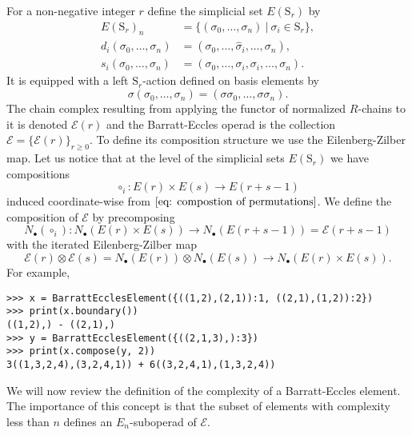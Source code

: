 \documentclass{amsart}
\renewcommand{\S}{\mathrm S}
\begin{document}
For a non-negative integer $r$ define the simplicial set $E(\mathrm S_r)$ by
\begin{align*}
E(\mathrm S_r)_n &= \{ (\sigma_0, \dots, \sigma_n)\ |\ \sigma_i \in \mathrm{S}_r\}, \\
d_i(\sigma_0, \dots, \sigma_n) &= (\sigma_0, \dots, \widehat{\sigma}_i, \dots, \sigma_n), \\
s_i(\sigma_0, \dots, \sigma_n) &= (\sigma_0, \dots, \sigma_i, \sigma_i, \dots, \sigma_n).
\end{align*}
It is equipped with a left $\mathrm S_r$-action defined on basis elements by
\begin{equation*}
\sigma (\sigma_0, \dots, \sigma_n) = (\sigma \sigma_0, \dots, \sigma \sigma_n).
\end{equation*}
The chain complex resulting from applying the functor of normalized $R$-chains to it is denoted $\mathcal E(r)$ and the Barratt-Eccles operad is the collection $\mathcal E = \{\mathcal E(r)\}_{r\geq0}$. To define its composition structure we use the Eilenberg-Zilber map. Let us notice that at the level of the simplicial sets $E(\S_r)$ we have compositions
\begin{equation*}
{\circ}_{i}: E(r) \times E(s) \to E(r + s - 1)
\end{equation*}
induced coordinate-wise from $\eqref{eq: compostion of permutations}$.
We define the composition of $\mathcal E$ by precomposing
\begin{equation*}
N_\bullet(\circ_i) \colon N_\bullet(E(r) \times E(s))
\longrightarrow
N_\bullet(E(r + s - 1)) = \mathcal E(r+s-1)
\end{equation*}
with the iterated Eilenberg-Zilber map
\begin{equation*}
\mathcal E(r) \otimes \mathcal E(s) =
N_\bullet(E(r)) \otimes N_\bullet(E(s))
\longrightarrow
N_\bullet(E(r) \times E(s)).
\end{equation*}
For example,
\begin{verbatim}
>>> x = BarrattEcclesElement({((1,2),(2,1)):1, ((2,1),(1,2)):2})
>>> print(x.boundary())
((1,2),) - ((2,1),)
>>> y = BarrattEcclesElement({((2,1,3),):3})
>>> print(x.compose(y, 2))
3((1,3,2,4),(3,2,4,1)) + 6((3,2,4,1),(1,3,2,4))
\end{verbatim}

We will now review the definition of the complexity of a Barratt-Eccles element. The importance of this concept is that the subset of elements with complexity less than $n$ defines an $E_n$-suboperad of $\mathcal E$.
\end{document}
